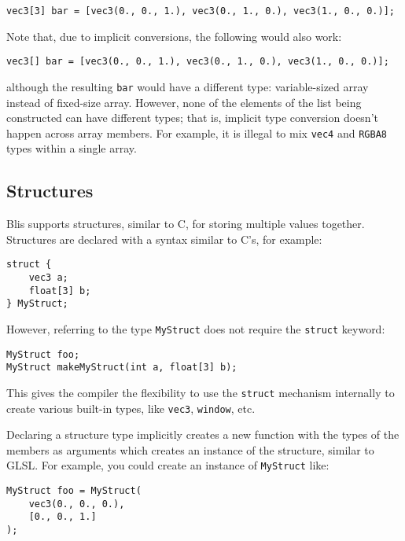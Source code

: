 \documentclass[11pt]{article}
\newcommand{\code}[1]{\texttt{#1}}
\begin{document}
\begin{lstlisting}
vec3[3] bar = [vec3(0., 0., 1.), vec3(0., 1., 0.), vec3(1., 0., 0.)];
\end{lstlisting}

Note that, due to implicit conversions, the following would also work:

\begin{lstlisting}
vec3[] bar = [vec3(0., 0., 1.), vec3(0., 1., 0.), vec3(1., 0., 0.)];
\end{lstlisting}

although the resulting \code{bar} would have a different type: variable-sized array instead of fixed-size array. However, none of the elements of the list being constructed can have different types; that is, implicit type conversion doesn't happen across array members. For example, it is illegal to mix \code{vec4} and \code{RGBA8} types within a single array.

\subsection{Structures}

Blis supports structures, similar to C, for storing multiple values together. Structures are declared with a syntax similar to C's, for example:

\begin{lstlisting}
struct {
	vec3 a;
	float[3] b;
} MyStruct;
\end{lstlisting}

However, referring to the type \code{MyStruct} does not require the \code{struct} keyword:

\begin{lstlisting}
MyStruct foo;
MyStruct makeMyStruct(int a, float[3] b);
\end{lstlisting}

This gives the compiler the flexibility to use the \code{struct} mechanism internally to create various built-in types, like \code{vec3}, \code{window}, etc.

Declaring a structure type implicitly creates a new function with the types of the members as arguments which creates an instance of the structure, similar to GLSL. For example, you could create an instance of \code{MyStruct} like:

\begin{lstlisting}
MyStruct foo = MyStruct(
	vec3(0., 0., 0.),
	[0., 0., 1.]
);
\end{lstlisting}
\end{document}
